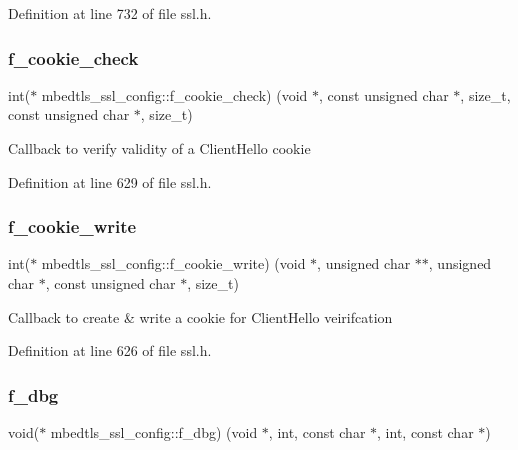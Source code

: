 Definition at line 732 of file ssl.\+h.

\mbox{\label{structmbedtls__ssl__config_a089b7c6caa6afcd078929131abf4f438}} 
\subsubsection{\texorpdfstring{f\+\_\+cookie\+\_\+check}{f\_cookie\_check}}
{\footnotesize\ttfamily int($\ast$ mbedtls\+\_\+ssl\+\_\+config\+::f\+\_\+cookie\+\_\+check) (void $\ast$, const unsigned char $\ast$, size\+\_\+t, const unsigned char $\ast$, size\+\_\+t)}

Callback to verify validity of a Client\+Hello cookie 

Definition at line 629 of file ssl.\+h.

\mbox{\label{structmbedtls__ssl__config_a362b8d558feda4b86ae8f464397e6ab2}} 
\subsubsection{\texorpdfstring{f\+\_\+cookie\+\_\+write}{f\_cookie\_write}}
{\footnotesize\ttfamily int($\ast$ mbedtls\+\_\+ssl\+\_\+config\+::f\+\_\+cookie\+\_\+write) (void $\ast$, unsigned char $\ast$$\ast$, unsigned char $\ast$, const unsigned char $\ast$, size\+\_\+t)}

Callback to create \& write a cookie for Client\+Hello veirifcation 

Definition at line 626 of file ssl.\+h.

\mbox{\label{structmbedtls__ssl__config_a9e57da8e5afa816d105a1ae95eb2e23d}} 
\subsubsection{\texorpdfstring{f\+\_\+dbg}{f\_dbg}}
{\footnotesize\ttfamily void($\ast$ mbedtls\+\_\+ssl\+\_\+config\+::f\+\_\+dbg) (void $\ast$, int, const char $\ast$, int, const char $\ast$)}

